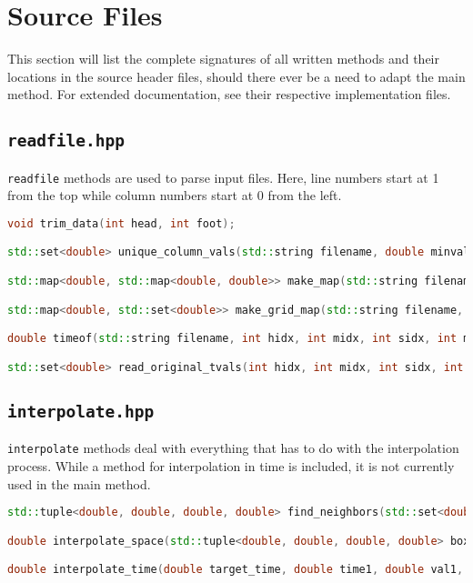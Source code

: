 \documentclass[hidelinks,12pt]{article}
\begin{document}
\section{Source Files}\label{headers}
This section will list the complete signatures of all written methods and their locations in the source header files, should there ever be a need to adapt the main method. For extended documentation, see their respective implementation files.

\subsection{\texttt{readfile.hpp}}
\texttt{readfile} methods are used to parse input files. Here, line numbers start at 1 from the top while column numbers start at 0 from the left.
\begin{lstlisting}[language=C++,basicstyle={\footnotesize\ttfamily}]
void trim_data(int head, int foot);

std::set<double> unique_column_vals(std::string filename, double minval, double maxval, int colnum);

std::map<double, std::map<double, double>> make_map(std::string filename, int xcolnum, int ycolnum, int depcolnum);

std::map<double, std::set<double>> make_grid_map(std::string filename, int xcolnum, double xminval, double xmaxval, int ycolnum, double yminval, double ymaxval);

double timeof(std::string filename, int hidx, int midx, int sidx, int msidx);

std::set<double> read_original_tvals(int hidx, int midx, int sidx, int msidx);
\end{lstlisting}

\subsection{\texttt{interpolate.hpp}}
\texttt{interpolate} methods deal with everything that has to do with the interpolation process. While a method for interpolation in time is included, it is not currently used in the main method.
\begin{lstlisting}[language=C++,basicstyle={\footnotesize\ttfamily}]
std::tuple<double, double, double, double> find_neighbors(std::set<double> xvals, std::set<double> yvals, double r, double phi);

double interpolate_space(std::tuple<double, double, double, double> box, std::map<double, std::map<double, double>> datamap, double r, double phi);

double interpolate_time(double target_time, double time1, double val1, double time2, double val2);
\end{lstlisting}
\end{document}
